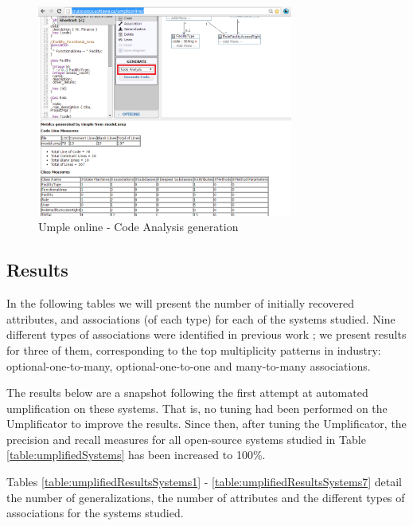 \begin{figure}[h]
\centering
\includegraphics[width=0.75\textwidth]{Figures/UmpleOnlineCodeAnalyzer.png} 
\caption{Umple online - Code Analysis generation}
\label{fig:onlineCodeAnalyzer}
\end{figure}

\subsection{Results}

In the following tables we will present the number of initially recovered  attributes, and associations (of each type) for each of the systems studied. Nine different types of associations were identified in previous work \cite{UmpleAssociations}; we present results for three of them, corresponding to the top multiplicity patterns in industry: optional-one-to-many, optional-one-to-one and many-to-many associations.

The results below are a snapshot following the first attempt at automated umplification on these systems. That is, no tuning had been performed on the Umplificator to improve the results. Since then, after tuning the Umplificator,  the precision and recall measures for all open-source systems studied in Table \ref{table:umplifiedSystems} has been increased to 100\%.

Tables \ref{table:umplifiedResultsSystems1} - \ref{table:umplifiedResultsSystems7} detail the number of generalizations, the number of attributes and the different types of associations for the systems studied.


